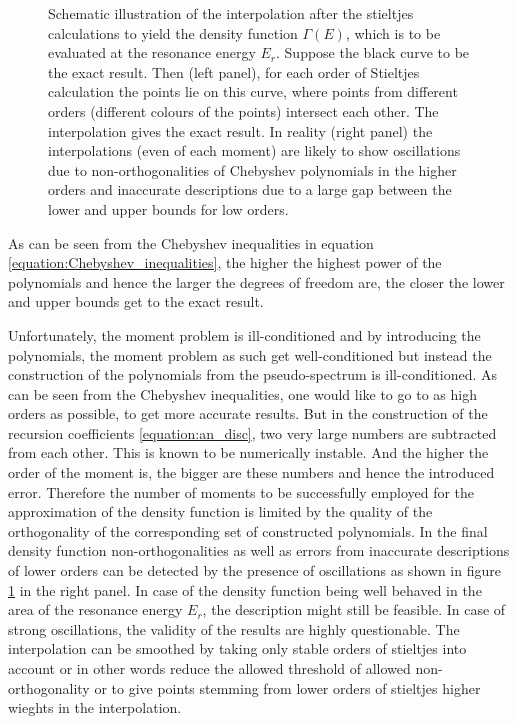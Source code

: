 \begin{figure}[h]
  \centering
  
  \caption{Schematic illustration of the interpolation after the
           stieltjes calculations to yield the density function $\Gamma(E)$,
           which is to be evaluated at the resonance energy $E_r$.
           Suppose the black curve to be the
           exact result. Then (left panel), for each order of Stieltjes calculation
           the points lie on this curve, where points from different orders
           (different colours of the points) intersect each other. The interpolation
           gives the exact result. In reality (right panel) the
           interpolations (even of each moment)
           are likely to show oscillations due to non-orthogonalities of
           Chebyshev polynomials in the higher orders and inaccurate descriptions
           due to a large gap between the lower and upper bounds for low
           orders.}
  \label{figure:stieltjes_density}
\end{figure}

As can be seen from the Chebyshev inequalities in
equation \ref{equation:Chebyshev_inequalities}, the higher the highest
power of the polynomials and hence the larger the degrees of freedom are,
the closer the lower and upper bounds get to the exact result.

Unfortunately, the moment problem is ill-conditioned and by introducing
the polynomials, the moment problem as such get well-conditioned but instead
the construction of the polynomials from the pseudo-spectrum is ill-conditioned.
As can be seen from the Chebyshev inequalities, one would like to go to as
high orders as possible, to get more accurate results. But in the construction
of the recursion coefficients \ref{equation:an_disc}, two very large numbers
are subtracted from each other. This is known to be numerically instable.
And the higher the order of the moment is, the bigger
are these numbers and hence the introduced error. Therefore the number
of moments to be successfully employed for the approximation of the
density function is limited by the quality of the orthogonality of
the corresponding set of constructed polynomials. In the final density function
non-orthogonalities as well as errors from inaccurate descriptions of lower
orders can be detected by the presence of oscillations as shown in
figure \ref{figure:stieltjes_density} in the right panel. In case of the density
function being well behaved in the area of the resonance energy $E_r$, the
description might still be feasible. In case of strong oscillations, the validity
of the results are highly questionable. The interpolation can be smoothed
by taking only stable orders of stieltjes into account or in other words
reduce the allowed threshold of allowed non-orthogonality or to give points
stemming from lower orders of stieltjes higher wieghts in the interpolation.
